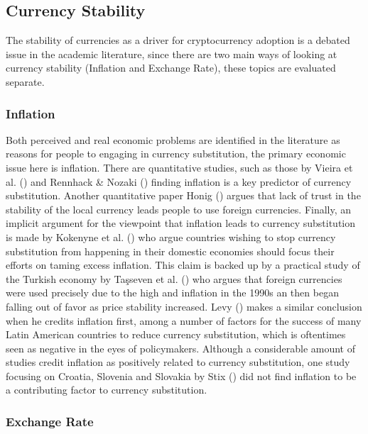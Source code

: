 \documentclass[
]{article}
\begin{document}
\subsection{Currency Stability}\label{currency-stability}

The stability of currencies as a driver for cryptocurrency adoption is a debated issue in the academic literature, since there are two main ways of looking at currency stability (Inflation and Exchange Rate), these topics are evaluated separate.

\subsubsection{Inflation}\label{inflation}

Both perceived and real economic problems are identified in the literature as reasons for people to engaging in currency substitution, the primary economic issue here is inflation. There are quantitative studies, such as those by Vieira et al. () and Rennhack \& Nozaki () finding inflation is a key predictor of currency substitution. Another quantitative paper Honig () argues that lack of trust in the stability of the local currency leads people to use foreign currencies. Finally, an implicit argument for the viewpoint that inflation leads to currency substitution is made by Kokenyne et al. () who argue countries wishing to stop currency substitution from happening in their domestic economies should focus their efforts on taming excess inflation. This claim is backed up by a practical study of the Turkish economy by Taşseven et al. () who argues that foreign currencies were used precisely due to the high and inflation in the 1990s an then began falling out of favor as price stability increased. Levy () makes a similar conclusion when he credits inflation first, among a number of factors for the success of many Latin American countries to reduce currency substitution, which is oftentimes seen as negative in the eyes of policymakers. Although a considerable amount of studies credit inflation as positively related to currency substitution, one study focusing on Croatia, Slovenia and Slovakia by Stix () did not find inflation to be a contributing factor to currency substitution.

\subsubsection{Exchange Rate}\label{exchange-rate}
\end{document}
